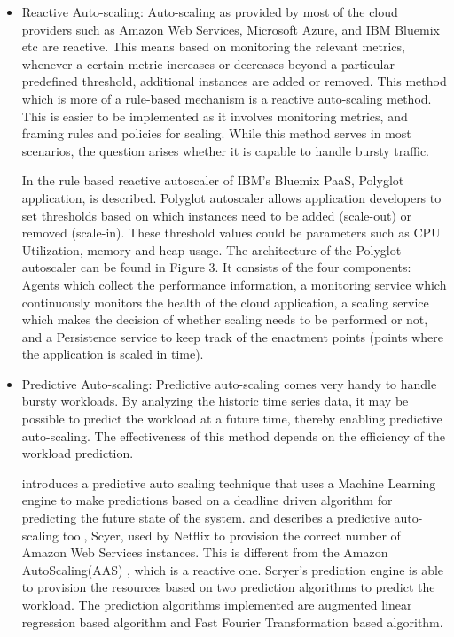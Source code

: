 \documentclass[article,type=msc,colorback,12pt,accentcolor=tud7b]{tudthesis}
\begin{document}
	\begin{itemize}
	
	\item{Reactive Auto-scaling: }Auto-scaling as provided by most of the cloud providers such as Amazon Web Services, Microsoft Azure, and IBM Bluemix etc are reactive. This means based on monitoring the relevant metrics, whenever a certain metric increases or decreases beyond a particular predefined threshold, additional instances are added or removed. This method which is more of a rule-based mechanism is a reactive auto-scaling method. This is easier to be implemented as it involves monitoring metrics, and framing rules and policies for scaling. While this method serves in most scenarios, the question arises whether it is capable to handle bursty traffic.
	
	In \cite{seelam2015polyglot} the rule based reactive autoscaler of IBM's Bluemix PaaS, Polyglot application, is described. Polyglot autoscaler allows application developers to set thresholds based on which instances need to be added (scale-out) or removed (scale-in). These threshold values could be parameters such as CPU Utilization, memory and heap usage. The architecture of the Polyglot autoscaler can be found in Figure 3. It consists of the four components: Agents which collect the performance information, a monitoring service which continuously monitors the health of the cloud application, a scaling service which makes the decision of whether scaling needs to be performed or not, and a Persistence service to keep track of the enactment points (points where the application is scaled in time).  

\item{Predictive Auto-scaling: }Predictive auto-scaling comes very handy to handle bursty workloads. By analyzing the historic time series data, it may be possible to predict the workload at a future time, thereby enabling predictive auto-scaling. The effectiveness of this method depends on the efficiency of the workload prediction.

\cite{biswas2015predictive} introduces a predictive auto scaling technique that uses a Machine Learning engine to make predictions based on a deadline driven algorithm for predicting the future state of the system. \cite{Scryer1} and \cite{Scryer2} describes a predictive auto-scaling tool, Scyer, used by Netflix to provision the correct number of Amazon Web Services \cite{aws} instances. This is different from the Amazon AutoScaling(AAS) \cite{aas}, which is a reactive one. Scryer's prediction engine is able to provision the resources based on two prediction algorithms to predict the workload. The prediction algorithms implemented are augmented linear regression based algorithm and Fast Fourier Transformation based algorithm.


\end{itemize}
\end{document}

